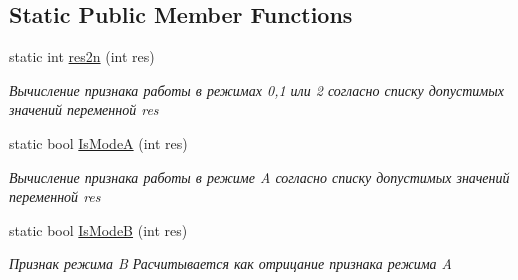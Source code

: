 \subsection*{Static Public Member Functions}
\begin{DoxyCompactItemize}
\item 
static int \hyperlink{class_c_v_i_engine_thread_a45d685448f47622c68e8f78593f7b69d}{res2n} (int res)
\begin{DoxyCompactList}\small\item\em Вычисление признака работы в режимах 0,1 или 2 согласно списку допустимых значений переменной res \end{DoxyCompactList}\item 
static bool \hyperlink{class_c_v_i_engine_thread_a85ffa17426e02ff2d5b03c5f37a1b0f8}{Is\+Mode\+A} (int res)
\begin{DoxyCompactList}\small\item\em Вычисление признака работы в режиме A согласно списку допустимых значений переменной res \end{DoxyCompactList}\item 
static bool \hyperlink{class_c_v_i_engine_thread_a4bbe730e3cd1bdadb1da99cce23fa8db}{Is\+Mode\+B} (int res)
\begin{DoxyCompactList}\small\item\em Признак режима B Расчитывается как отрицание признака режима A \end{DoxyCompactList}\end{DoxyCompactItemize}

